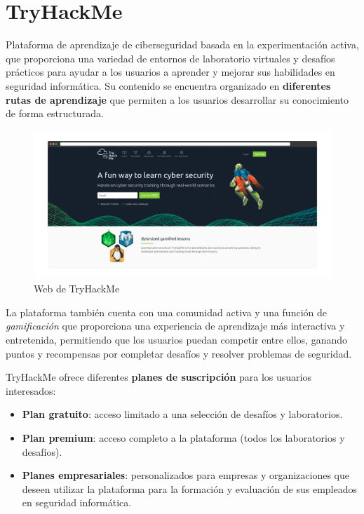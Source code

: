         \newpage
    
    
    \section{TryHackMe}
    
        Plataforma de aprendizaje de ciberseguridad basada en la experimentación activa, que proporciona una variedad de entornos de laboratorio virtuales y desafíos prácticos para ayudar a los usuarios a aprender y mejorar sus habilidades en seguridad informática. Su contenido se encuentra organizado en \textbf{diferentes rutas de aprendizaje} que permiten a los usuarios desarrollar su conocimiento de forma estructurada.
        
        \begin{figure}[h]
            \centering

            \includegraphics[width=\textwidth]{images/Capturas/Web de THM.png}

            \caption{Web de TryHackMe}
            \label{fig:THM-web}
        \end{figure}
        
        La plataforma también cuenta con una comunidad activa y una función de \textit{gamificación} que proporciona una experiencia de aprendizaje más interactiva y entretenida, permitiendo que los usuarios puedan competir entre ellos, ganando puntos y recompensas por completar desafíos y resolver problemas de seguridad.
        
        TryHackMe ofrece diferentes \textbf{planes de suscripción} para los usuarios interesados:
        
        \begin{itemize}
            \item \textbf{Plan gratuito}: acceso limitado a una selección de desafíos y laboratorios.
        
            \item \textbf{Plan premium}: acceso completo a la plataforma (todos los laboratorios y desafíos).
        
            \item \textbf{Planes empresariales}: personalizados para empresas y organizaciones que deseen utilizar la plataforma para la formación y evaluación de sus empleados en seguridad informática.
        \end{itemize}
        
